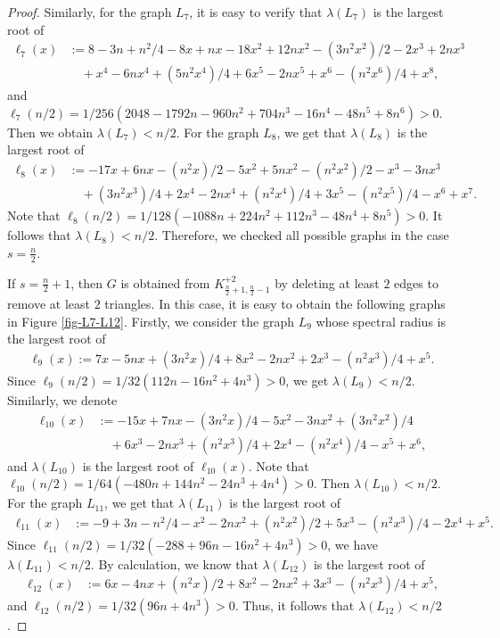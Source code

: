 \documentclass[11pt]{article}
\begin{document}
\begin{proof}
\noindent 
    Similarly, for the graph $L_7$, 
    it is easy to verify that $\lambda (L_7)$ is the largest root of 
      \begin{align*} 
   \ell_7(x) &:= 
   8 - 3 n + n^2/4 - 8 x + n x - 18 x^2 + 12 n x^2 - (3 n^2 x^2)/2 - 
 2 x^3 + 2 n x^3 \\ 
 & \quad  + x^4  - 6 n x^4 + (5 n^2 x^4)/4 + 6 x^5 - 
 2 n x^5 + x^6 - (n^2 x^6)/4 + x^8, 
\end{align*} 
and $\ell_7(n/2) = 1/256 (2048 - 1792 n - 960 n^2 + 704 n^3 - 16 n^4 - 48 n^5 + 8 n^6)>0$. Then we obtain $\lambda (L_7)< n/2$. 
For the graph $L_8$, we get that $\lambda (L_8)$ 
is the largest root of 
\begin{align*} 
   \ell_8(x) &:= -17 x + 6 n x - (n^2 x)/2 - 5 x^2 + 5 n x^2 - (n^2 x^2)/2 - x^3 - 
 3 n x^3 \\
 &\quad + (3 n^2 x^3)/4  + 2 x^4 - 2 n x^4 + (n^2 x^4)/4 + 3 x^5 - (
 n^2 x^5)/4 - x^6 + x^7. 
 \end{align*} 
Note that $\ell_8(n/2) = 1/128 (-1088 n + 224 n^2 + 112 n^3 - 48 n^4 + 8 n^5)>0$. 
It follows that $\lambda (L_8) < n/2$. 
Therefore, we checked all possible graphs in the case $s=\frac{n}{2}$. 

If $s=\frac{n}{2} +1$, then $G$ is obtained from $K_{\frac{n}{2} +1, \frac{n}{2} -1}^{+2}$ by deleting at least $2$ edges to remove 
at least $2$ triangles. 
In this case, it is easy to obtain the following graphs in Figure \ref{fig-L7-L12}. Firstly, we consider the graph $L_9$ whose spectral radius is the largest root of 
\begin{align*} 
   \ell_9(x) :=7 x - 5 n x + (3 n^2 x)/4 + 8 x^2 - 2 n x^2 + 2 x^3 - (
 n^2 x^3)/4 + x^5.  
\end{align*} 
Since $\ell_9(n/2)= 1/32 (112 n - 16 n^2 + 4 n^3) >0$, 
we get $\lambda (L_9) < n/2$. Similarly, we denote 
\begin{align*} 
\ell_{10}(x) &:= -15 x + 7 n x - (3 n^2 x)/4 - 5 x^2 - 3 n x^2 + (3 n^2 x^2)/4  \\ 
& \quad + 6 x^3 - 2 n x^3 + (n^2 x^3)/4 + 2 x^4 - (n^2 x^4)/4 - x^5 + x^6, 
 \end{align*} 
and $\lambda (L_{10})$ is the largest root of $\ell_{10}(x)$. 
Note that $\ell_{10}(n/2) = 1/64 (-480 n + 144 n^2 - 24 n^3 + 4 n^4) >0$. Then $\lambda (L_{10}) < n/2$. 
For the graph $L_{11}$, we get that $\lambda (L_{11})$ 
is the largest root of 
\begin{align*} 
\ell_{11}(x) &:= -9 + 3 n - n^2/4 - x^2 - 2 n x^2 + (n^2 x^2)/2  + 5 x^3 - (n^2 x^3)/4 - 2 x^4 + x^5. 
 \end{align*} 
 Since $\ell_{11}(n/2)= 1/32 (-288 + 96 n - 16 n^2 + 4 n^3)>0$, 
 we have $\lambda (L_{11}) < n/2$. 
By calculation, we know that $\lambda (L_{12})$ is the largest 
root of 
\begin{align*} 
\ell_{12}(x) &:= 6 x - 4 n x + (n^2 x)/2 + 8 x^2 - 2 n x^2 + 3 x^3 - (n^2 x^3)/4 + x^5,  
 \end{align*}  
 and $\ell_{12}(n/2) = 1/32 (96 n + 4 n^3) >0$. 
Thus, it follows that $\lambda (L_{12}) < n/2$. 
 

\end{proof}
\end{document}
